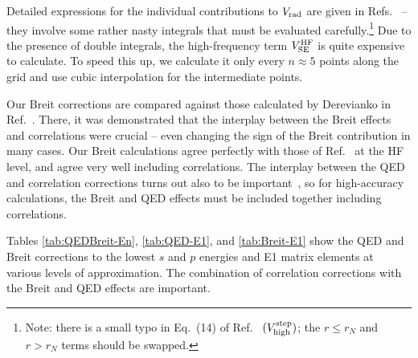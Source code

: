 \documentclass[10pt,twocolumn,a4paper]{article}%
\begin{document}
Detailed expressions for the individual contributions to $V_{\rm rad}$ are given in Refs.~\cite{FlambaumQED2005,GingesQED2015,Ginges2016} -- they involve some rather nasty integrals that must be evaluated carefully.\footnote{Note: there is a small typo in Eq.~(14)  of Ref.~\cite{Ginges2016} $(V^{\rm step}_{\rm high})$; the $r\leq r_N$ and  $r> r_N$ terms should be swapped.}
Due to the presence of double integrals, the high-frequency term $V_{\rm SE}^{\rm HF}$ is quite expensive to calculate.
To speed this up, we calculate it only every $n\approx5$ points along the grid
and use cubic interpolation for the intermediate points.


Our Breit corrections are compared against those calculated by Derevianko in Ref.~\cite{Derevianko2001}.
There, it was demonstrated that the interplay between the Breit effects and correlations were crucial -- even changing the sign of the Breit contribution in many cases.
Our Breit calculations agree perfectly with those of Ref.~\cite{Derevianko2001} at the HF level, and agree very well including correlations.
%
The interplay between the QED and correlation corrections turns out also to be important~\cite{GingesQED2015,Ginges2016}, so for high-accuracy calculations, the Breit and QED effects must be included together including correlations.


Tables \ref{tab:QEDBreit-En}, \ref{tab:QED-E1}, and \ref{tab:Breit-E1} show the QED and Breit corrections to the lowest $s$ and $p$ energies and E1 matrix elements at various levels of approximation.
The combination of correlation corrections with the Breit and QED effects are important.
\end{document}
